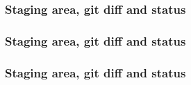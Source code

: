 \documentclass{beamer}
\begin{document}
    \begin{frame}
        \frametitle{Staging area, git diff and status}
        \begin{figure}[H]
            \centering
            \noindent
        \end{figure}
    \end{frame}
    \begin{frame}
        \frametitle{Staging area, git diff and status}
        \begin{figure}[H]
            \centering
            \noindent
            \label{fig:figure5}
        \end{figure}
    \end{frame}
    \begin{frame}
        \frametitle{Staging area, git diff and status}
        \begin{figure}[H]
            \centering
            \noindent
        \end{figure}
    \end{frame}
\end{document}
